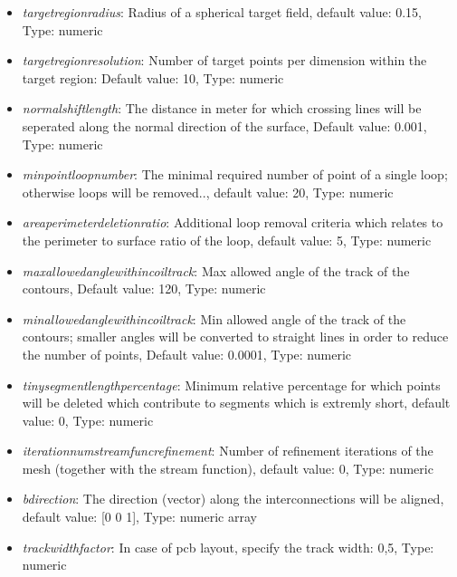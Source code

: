 \documentclass[a4paper,12pt]{book}
\begin{document}
\begin{itemize}
	\item  \textit{target\textunderscore region\textunderscore radius}: Radius of a spherical target field, default value: 0.15, Type: numeric
	\item  \textit{target\textunderscore region\textunderscore resolution}: Number of target points per dimension within the target region: Default value: 10, Type: numeric
	\item  \textit{normal\textunderscore shift\textunderscore length}:  The distance in meter for which crossing lines will be seperated along the normal direction of the surface, Default value: 0.001, Type: numeric
	\item  \textit{min\textunderscore point\textunderscore loop\textunderscore number}: The minimal required number of point of a single loop; otherwise loops will be removed.., default value: 20, Type: numeric
	\item  \textit{area\textunderscore perimeter\textunderscore deletion\textunderscore ratio}: Additional loop removal criteria which relates to the perimeter to surface ratio of the loop, default value: 5, Type: numeric
	\item  \textit{max\textunderscore allowed\textunderscore angle\textunderscore within\textunderscore coil\textunderscore track}: Max allowed angle of the track of the contours, Default value: 120, Type: numeric
	\item  \textit{min\textunderscore allowed\textunderscore angle\textunderscore within\textunderscore coil\textunderscore track}: Min allowed angle of the track of the contours; smaller angles will be converted to straight lines in order to reduce the number of points, Default value: 0.0001, Type: numeric
	\item  \textit{tiny\textunderscore segment\textunderscore length\textunderscore percentage}: Minimum relative percentage for which points will be deleted which contribute to segments which is extremly short, default value: 0, Type: numeric
	\item  \textit{iteration\textunderscore num\textunderscore stream\textunderscore func\textunderscore refinement}: Number of refinement iterations of the mesh (together with the stream function), default value: 0, Type: numeric
	\item  \textit{b\textunderscore direction}: The direction (vector) along the interconnections will be aligned, default value: [0 0 1], Type: numeric array
	\item  \textit{track\textunderscore width\textunderscore factor}: In case of pcb layout, specify the track width: 0,5, Type: numeric

\end{itemize}
\end{document}
